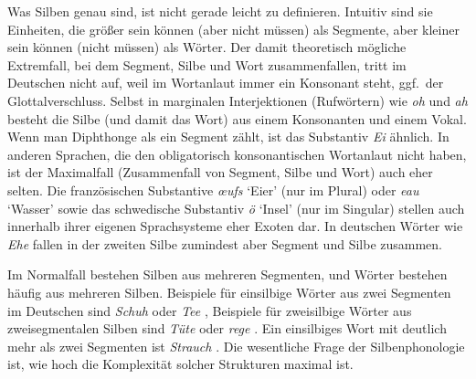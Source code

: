 Was Silben genau sind, ist nicht gerade leicht zu definieren.
Intuitiv sind sie Einheiten, die größer sein können (aber nicht müssen) als Segmente, aber kleiner sein können (nicht müssen) als Wörter.
Der damit theoretisch mögliche Extremfall, bei dem Segment, Silbe und Wort zusammenfallen, tritt im Deutschen nicht auf, weil im Wortanlaut immer ein Konsonant steht, ggf.\ der Glottalverschluss.
Selbst in marginalen Interjektionen (Rufwörtern) wie \textit{oh} \textipa{[Po:]} und \textit{ah} \textipa{[Pa:]} besteht die Silbe (und damit das Wort) aus einem Konsonanten und einem Vokal.
Wenn man Diphthonge als ein Segment zählt, ist das Substantiv \textit{Ei} \textipa{[P\t{aE}]} ähnlich.
In anderen Sprachen, die den obligatorisch konsonantischen Wortanlaut nicht haben, ist der Maximalfall (Zusammenfall von Segment, Silbe und Wort) auch eher selten.
Die französischen Substantive \textit{œufs} \textipa{[\o:]} `Eier' (nur im Plural) oder \textit{eau} \textipa{[o:]} `Wasser' sowie das schwedische Substantiv \textit{ö} \textipa{[\oe:]} `Insel' (nur im Singular) stellen auch innerhalb ihrer eigenen Sprachsysteme eher Exoten dar.
In deutschen Wörter wie \textit{Ehe} \textipa{[Pe:@]} fallen in der zweiten Silbe zumindest aber Segment und Silbe \textipa{[@]} zusammen.

Im Normalfall bestehen Silben aus mehreren Segmenten, und Wörter bestehen häufig aus mehreren Silben.
Beispiele für einsilbige Wörter aus zwei Segmenten im Deutschen sind \textit{Schuh} \textipa{[Su:]} oder \textit{Tee} \textipa{[te:]}, Beispiele für zweisilbige Wörter aus zweisegmentalen Silben sind \textit{Tüte} \textipa{[ty:t@]} oder \textit{rege} \textipa{[Ke:g@]}.
Ein einsilbiges Wort mit deutlich mehr als zwei Segmenten ist \textit{Strauch} \textipa{[StK\t{aO}X]}. 
Die wesentliche Frage der Silbenphonologie ist, wie hoch die Komplexität solcher Strukturen maximal ist.



